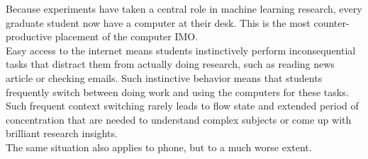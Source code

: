 \documentclass[11pt]{article}
\begin{document}
Because experiments have taken a central role in machine learning research, every graduate student now have a computer at their desk. This is the most counter-productive placement of the computer IMO. 
\\

Easy access to the internet means students instinctively perform inconsequential tasks that distract them from actually doing research, such as reading news article or checking emails. Such instinctive behavior means that students frequently switch between doing work and using the computers for these tasks. Such frequent context switching rarely leads to flow state and extended period of concentration that are needed to understand complex subjects or come up with brilliant research insights.
\\

The same situation also applies to phone, but to a much worse extent.
\end{document}
